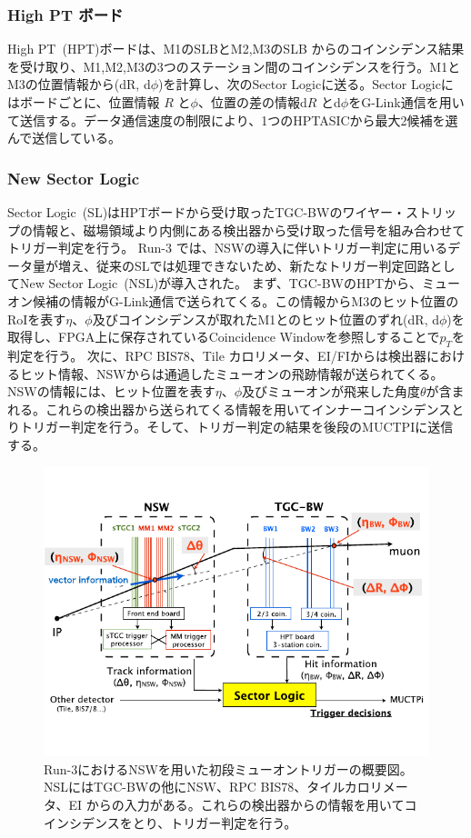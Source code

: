 \subsubsection{High PT ボード}
High PT~(HPT)ボードは、M1のSLBとM2,M3のSLB からのコインシデンス結果を受け取り、M1,M2,M3の3つのステーション間のコインシデンスを行う。M1とM3の位置情報から(dR, d$\phi$)を計算し、次のSector Logicに送る。Sector Logicにはボードごとに、位置情報 $R$ と$\phi$、位置の差の情報d$R$ とd$\phi$をG-Link通信を用いて送信する。データ通信速度の制限により、1つのHPTASICから最大2候補を選んで送信している。

\subsubsection{New Sector Logic}
Sector Logic~(SL)はHPTボードから受け取ったTGC-BWのワイヤー・ストリップの情報と、磁場領域より内側にある検出器から受け取った信号を組み合わせてトリガー判定を行う。
Run-3 では、NSWの導入に伴いトリガー判定に用いるデータ量が増え、従来のSLでは処理できないため、新たなトリガー判定回路としてNew Sector Logic~(NSL)が導入された。
まず、TGC-BWのHPTから、ミューオン候補の情報がG-Link通信で送られてくる。この情報からM3のヒット位置のRoIを表す$\eta$、$\phi$及びコインシデンスが取れたM1とのヒット位置のずれ(dR, d$\phi$)を取得し、FPGA上に保存されているCoincidence Windowを参照しすることで$p_T$を判定を行う。
次に、RPC BIS78、Tile カロリメータ、EI/FIからは検出器におけるヒット情報、NSWからは通過したミューオンの飛跡情報が送られてくる。NSWの情報には、ヒット位置を表す$\eta$、$\phi$及びミューオンが飛来した角度$\theta$が含まれる。これらの検出器から送られてくる情報を用いてインナーコインシデンスとりトリガー判定を行う。そして、トリガー判定の結果を後段のMUCTPIに送信する。

\begin{figure}[tb]
  \centering
  \includegraphics[clip, width=14cm]{fig/2/NSW_innercoin.pdf}
  \caption{Run-3におけるNSWを用いた初段ミューオントリガーの概要図\cite{article:akatsuka-mron}。NSLにはTGC-BWの他にNSW、RPC BIS78、タイルカロリメータ、EI からの入力がある。これらの検出器からの情報を用いてコインシデンスをとり、トリガー判定を行う。}
  \label{fig:NSW_inner}
\end{figure}


